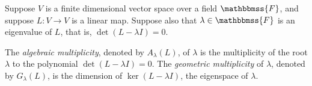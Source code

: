 \documentclass[12pt]{article}
\newcommand{\F}{\mathbbmss{F}}
\begin{document}
Suppose $V$ is a finite dimensional vector space over a field $\F$,
 and suppose $L\colon V\to V$ is a linear map. 
Suppose also that $\lambda\in \F$ is an
eigenvalue of $L$, that is, $\operatorname{det}( L - \lambda I)=0$.

The  \emph{algebrai{c} multiplicit{y}}, 
  denoted by $A_\lambda(L)$, of $\lambda$
    is the multiplicity of the root $\lambda$ to the polynomial
   $\operatorname{det}( L - \lambda I)=0$.
The \emph{geometric multiplicity} of $\lambda$, denoted by 
    $G_\lambda(L)$, is the
   dimension of $\ker ( L - \lambda I)$, the eigenspace of $\lambda$.
\end{document}
